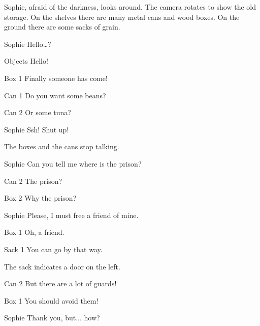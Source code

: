 \begin{screenplay}

Sophie, afraid of the darkness, looks around. The camera rotates to show the old storage. On the shelves there are many metal cans and wood boxes. On the ground there are some sacks of grain.

\begin{dialogue}{Sophie}
Hello…?
\end{dialogue}
\begin{dialogue}[cheerful]{Objects}
 Hello!
\end{dialogue}
\begin{dialogue}{Box 1}
 Finally someone has come!
\end{dialogue}
\begin{dialogue}{Can 1}
 Do you want some beans?
\end{dialogue}
\begin{dialogue}{Can 2}
Or some tuna?
\end{dialogue}
\begin{dialogue}[worried]{Sophie}
Ssh! Shut up!
\end{dialogue}
The boxes and the cans stop talking.
\begin{dialogue}{Sophie}
Can you tell me where is the prison?
\end{dialogue}
\begin{dialogue}[surprised]{Can 2}
The prison?
\end{dialogue}
\begin{dialogue}[surprised]{Box 2}
Why the prison?
\end{dialogue}
\begin{dialogue}{Sophie}
Please, I must free a friend of mine.
\end{dialogue}
\begin{dialogue}{Box 1}
Oh, a friend.
\end{dialogue}
\begin{dialogue}{Sack 1}
You can go by that way.
\end{dialogue}
The sack indicates a door on the left.
\begin{dialogue}{Can 2}
But there are a lot of guards!
\end{dialogue}
\begin{dialogue}{Box 1}
You should avoid them!
\end{dialogue}
\begin{dialogue}{Sophie}
Thank you, but... how?
\end{dialogue}

\end{screenplay}
